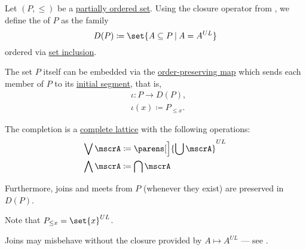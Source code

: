 \begin{definition}\label{def:dedekind_macnielle_completion}
  Let \( (P, \leq) \) be a \hyperref[def:partially_ordered_set]{partially ordered set}. Using the closure operator from , we define the  of \( P \) as the family
  \begin{equation*}
    D(P) \coloneqq \set{ A \subseteq P \given A = A^{UL} }
  \end{equation*}
  ordered via \hyperref[def:subset]{set inclusion}.

  The set \( P \) itself can be embedded via the \hyperref[def:order_homomorphism/increasing]{order-preserving map} which sends each member of \( P \) to its \hyperref[def:order_interval/ray]{initial segment}, that is,
  \begin{equation*}
    \begin{aligned}
      &\iota: P \to D(P), \\
      &\iota(x) \coloneqq P_{\leq x}.
    \end{aligned}
  \end{equation*}

  The completion is a \hyperref[def:semilattice/lattice]{complete lattice} with the following operations:
  \begin{align*}
    \bigvee \mscrA   &\coloneqq \parens[\Big]{ \bigcup \mscrA }^{UL} \\
    \bigwedge \mscrA &\coloneqq \bigcap \mscrA
  \end{align*}

  Furthermore, joins and meets from \( P \) (whenever they exist) are preserved in \( D(P) \).
\end{definition}
\begin{comments}
  \item Note that \( P_{\leq x} = \set{ x }^{UL} \).
  \item Joins may misbehave without the closure provided by \( A \mapsto A^{UL} \) --- see .
\end{comments}

